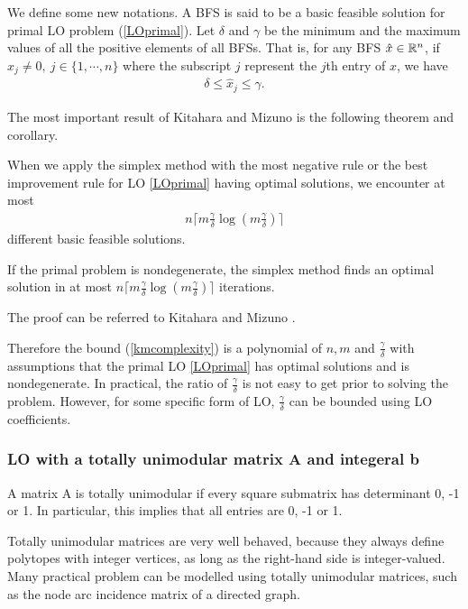 \documentclass[11pt]{article}
\begin{document}
We define some new notations. A BFS is said to be a basic feasible solution for primal LO problem (\ref{LOprimal}). Let $\delta$ and $\gamma$ be the minimum and the maximum values of all the positive elements of all BFSs. That is, for any BFS $\hat{x} \in \mathbb{R}^{n}$, if $\hat{x}_j \neq 0, \ j \in \{1, \cdots, n\}$ where the subscript $j$ represent the $j$th entry of $\hat{x}$, we have 
\begin{align}
\delta \le \hat{x}_j \le \gamma. \label{eq:bfsbound}
\end{align} 

The most important result of Kitahara and Mizuno \cite{kitahara2013bound} is the following theorem and corollary.
\begin{theorem}
When we apply the simplex method with the most negative rule or the best improvement rule for LO \ref{LOprimal} having optimal solutions, we encounter at most
\begin{align}
n\lceil m \frac{\gamma}{\delta}\log(m\frac{\gamma}{\delta})\rceil \label{kmcomplexity}
\end{align}
different basic feasible solutions. \label{KTheorem1}
\end{theorem}

\begin{corollary}
 If the primal problem is nondegenerate, the simplex method finds an optimal solution in at most $n\lceil m \frac{\gamma}{\delta}\log(m\frac{\gamma}{\delta})\rceil$ iterations.
\end{corollary}
The proof can be referred to Kitahara and Mizuno \cite{kitahara2013bound}. 

Therefore the bound (\ref{kmcomplexity}) is a polynomial of $n, m$ and $\frac{\gamma}{\delta}$ with assumptions that the primal LO \ref{LOprimal} has optimal solutions and is nondegenerate. In practical, the ratio of $\frac{\gamma}{\delta}$ is not easy to get prior to solving the problem. However, for some specific form of LO, $\frac{\gamma}{\delta}$ can be bounded using  LO coefficients. 
\subsubsection{LO with a totally unimodular matrix A and integeral b}
\begin{definition}
A matrix A is totally unimodular if every square submatrix has determinant 0, -1 or 1. In particular, this implies that all entries are 0, -1 or 1.
\end{definition}
Totally unimodular matrices are very well behaved, because they always define polytopes with integer vertices, as long as the right-hand side is integer-valued. Many practical problem can be modelled using totally unimodular matrices, such as the node arc incidence matrix of a directed graph.
\end{document}
